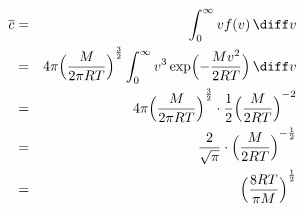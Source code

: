 \begin{eqnarray*}
\overline{c} &=& \int_{0}^{\infty} 
vf(v)
\,\diff v \\
&=& 
4\pi {
    \Bigl(
        \frac{M}{2\pi RT}
    \Bigr) 
}^\frac{3}{2} 
\int_{0}^{\infty} 
    v^{3} 
    \exp 
    \Bigl( 
      - \frac{Mv^{2}}{2RT} 
    \Bigr) 
\,\diff v 
\\ &=& 
    4\pi {
        \Bigl(
            \frac{M}{2\pi RT}
        \Bigr) 
    }^\frac{3}{2} 
\cdot
\frac{1}{2}
    {
        \Bigl(
            \frac{M}{2 RT}
        \Bigr) 
    }^{-2} 
\\ &=&
\frac{2}{\sqrt{\pi}}
\cdot
{
    \Bigl(
        \frac{M}{2 RT}
    \Bigr) 
}^{- \frac{1}{2} }
\\ &=&
{
    \Bigl(
        \frac{8 RT}{\pi M}
    \Bigr) 
}^{\frac{1}{2} }
\label{}
\end{eqnarray*}